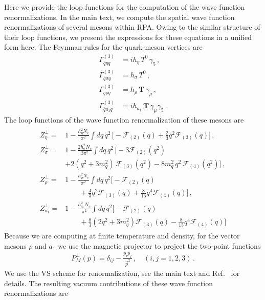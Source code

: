 \documentclass[reprint,english,superscriptaddress,preprintnumbers,amsmath,amssymb,aps,prd]{revtex4-2}
\begin{document}
Here we provide the loop functions for the computation of the wave function renormalizations. In the main text, we compute the spatial wave function renormalizations of several mesons within RPA. Owing to the similar structure of their loop functions, we present the expressions for these equations in a unified form here. The Feynman rules for the quark-meson vertices are
%
\begin{align}
\Gamma_{\bar{q}\eta q}^{(3)}&=ih_\eta\,T^0\,\gamma_5\,,\\[2ex]
\Gamma_{\bar{q}\sigma q}^{(3)}&=h_\sigma\,T^0\,,\\[2ex]
\Gamma_{\bar{q}\rho q}^{(3)}&=h_\rho\,\mathbf{T}\,\gamma_\mu\,,\\[2ex]
\Gamma_{\bar{q}a_1 q}^{(3)}&=ih_{a_1}\,\mathbf{T}\,\gamma_\mu\gamma_5\,.
\end{align}
%
The loop functions of the wave function renormalization of these mesons are
%
\begin{align}\label{eq:Zdef}
\begin{split}
Z^{\perp}_{\eta}=&1-\frac{h_\eta^2N_c}{\pi^2}\int dq\,q^2\,\bigg[-\mathcal{F}_{(2)}(q)+\frac{2}{3}q^2\mathcal{F}_{(3)}(q)\bigg]\,,\\[2ex]
Z^{\perp}_{\sigma}=&1-\frac{2h_\sigma^2N_c}{3\pi^2}\int dq\,q^2\,\bigg[-3\mathcal{F}_{(2)}(q^2)\\[2ex]
&+2(q^2+3m^2_q)\,\mathcal{F}_{(3)}(q^2)-8m^2_q \,q^2\,\mathcal{F}_{(4)}(q^2)\bigg]\,,\\[2ex]
Z^{\perp}_{\rho}=&1-\frac{h_\rho^2N_c}{\pi^2}\int dq\,q^2\bigg[-\mathcal{F}_{(2)}(q)\\[2ex]
&\qquad+\frac{4}{3}q^2\mathcal{F}_{(3)}(q)+\frac{8}{15}q^4\mathcal{F}_{(4)}(q)\bigg]\,,\\[2ex]
Z^{\perp}_{a_1}=&1-\frac{h_{a_1}^2N_c}{\pi^2}\int dq\,q^2\bigg[-\mathcal{F}_{(2)}(q)\\[2ex]
&\qquad+\frac{8}{3}(2q^2+3m_q^2)\mathcal{F}_{(3)}(q)-\frac{8}{15}q^4\mathcal{F}_{(4)}(q)\bigg]
\end{split}
\end{align}
%
Because we are computing at finite temperature and density, for the vector mesons $\rho$ and $a_1$ we use the magnetic projector to project the two-point functions
%
\begin{align}
P^\perp_M(p)=\delta_{ij}-\frac{p_i p_j}{\vec{p}^2}\,,\quad (i,j=1,2,3)\,.
\end{align}
%
We use the VS scheme for renormalization, see the main text and Ref.\ \cite{Rennecke:2025kub} for details. The resulting vacuum contributions of these wave function renormalizations are
\end{document}
